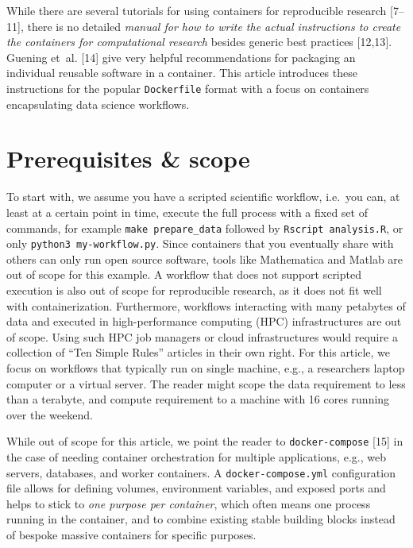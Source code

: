 \documentclass[10pt,letterpaper]{article}
\begin{document}
While there are several tutorials for using containers for reproducible
research {[}7--11{]}, there is no detailed \emph{manual for how to write
the actual instructions to create the containers for computational
research} besides generic best practices {[}12,13{]}. Guening et~al.
{[}14{]} give very helpful recommendations for packaging an individual
reusable software in a container. This article introduces these
instructions for the popular \texttt{Dockerfile} format with a focus on
containers encapsulating data science workflows.

\hypertarget{prerequisites-scope}{%
\section{Prerequisites \& scope}\label{prerequisites-scope}}

To start with, we assume you have a scripted scientific workflow,
i.e.~you can, at least at a certain point in time, execute the full
process with a fixed set of commands, for example
\texttt{make\ prepare\_data} followed by \texttt{Rscript\ analysis.R},
or only \texttt{python3\ my-workflow.py}. Since containers that you
eventually share with others can only run open source software, tools
like Mathematica and Matlab are out of scope for this example. A
workflow that does not support scripted execution is also out of scope
for reproducible research, as it does not fit well with
containerization. Furthermore, workflows interacting with many petabytes
of data and executed in high-performance computing (HPC) infrastructures
are out of scope. Using such HPC job managers or cloud infrastructures
would require a collection of ``Ten Simple Rules'' articles in their own
right. For this article, we focus on workflows that typically run on
single machine, e.g., a researchers laptop computer or a virtual server.
The reader might scope the data requirement to less than a terabyte, and
compute requirement to a machine with 16 cores running over the weekend.

While out of scope for this article, we point the reader to
\texttt{docker-compose} {[}15{]} in the case of needing container
orchestration for multiple applications, e.g., web servers, databases,
and worker containers. A \texttt{docker-compose.yml} configuration file
allows for defining volumes, environment variables, and exposed ports
and helps to stick to \emph{one purpose per container}, which often
means one process running in the container, and to combine existing
stable building blocks instead of bespoke massive containers for
specific purposes.
\end{document}

